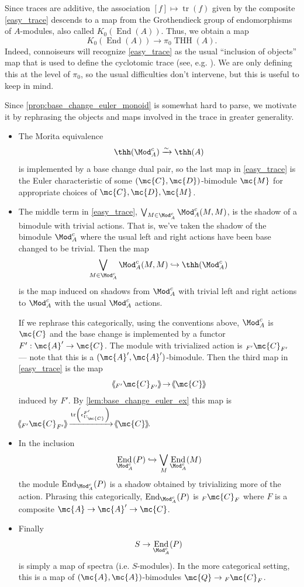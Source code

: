 \documentclass[11pt]{amsart}
\DeclareMathOperator{\End}{End}
\DeclareMathOperator{\tr}{tr}
\newcommand{\rbm}[4]{{#1}^{#2}_{#4}} %
\def\shvar#1#2{{\ensuremath{%
  \hspace{1mm}\makebox[-1mm]{$#1\langle$}\makebox[0mm]{$#1\langle$}\hspace{1mm}%
  {#2}%
  \makebox[1mm]{$#1\rangle$}\makebox[0mm]{$#1\rangle$}%
}}}
\def\sh{\shvar{}}
\begin{document}
\begin{rmk}
  Since traces are additive, the association $[f] \mapsto \operatorname{tr}(f)$ given by the composite \eqref{easy_trace} descends to a map from the Grothendieck group of endomorphisms of $A$-modules, also called $K_0 (\operatorname{End}(A))$. Thus, we obtain a map
  \[
  K_0 (\operatorname{End}(A)) \to \pi_0 \operatorname{THH}(A).
  \]
  Indeed, connoiseurs will recognize \eqref{easy_trace} as the usual ``inclusion of objects'' map that is used to define the cyclotomic trace (see, e.g. \cite{dundas_mccarthy}). We are only defining this at the level of $\pi_0$, so the usual difficulties don't intervene, but this is useful to keep in mind. 
\end{rmk}

Since  \cref{prop:base_change_euler_monoid} is somewhat hard to parse, we motivate it by rephrasing the objects and maps involved in the trace in greater generality. 
\begin{itemize}
\item The Morita equivalence
\[
\thh(\Mod^c_A) \xrightarrow{\sim} \thh(A)
\]
is implemented by a base change dual pair, so the last map in \eqref{easy_trace} is  the Euler characteristic of some $(\mc{C}, \mc{D})$-bimodule $\mc{M}$ for appropriate choices of $\mc{C}, \mc{D}, \mc{M}$. 

\item The middle term in \eqref{easy_trace},  $\bigvee_{M \in \Mod^c_A} \Mod^c_A (M, M)$, is the shadow of a bimodule with trivial actions. That is, we've taken the shadow of the bimodule $\Mod^c_A$ where the usual left and right actions have been base changed to be trivial. 
Then the  map
\[
\bigvee_{M \in \Mod^c_A} \Mod^c_A (M, M) \hookrightarrow \thh(\Mod^c_A)
\]
is the map induced on shadows from $\Mod_A^c$ with trivial left and right actions to $\Mod_A^c$ with the usual $\Mod_A^c$ actions. 

If we rephrase this categorically, using the conventions above, $\Mod_A^c$ is $\mc{C}$ and the base change is implemented by a functor $F': \mc{A}' \to \mc{C}$. The module with trivialized action is $ _{F'} \mc{C}_{F'}$ --- note that this is a $(\mc{A}',\mc{A}')$-bimodule.  Then the third map in \eqref{easy_trace} is the map 
\[\sh{_{F'}\mc{C}_{F'}}\to \sh{\mc{C}}\]
induced by $F'$.
By \cref{lem:base_change_euler_ex} this map is $\sh{_{F'} \mc{C}_{F'}} \xrightarrow{\tr\left(\rbm{\epsilon}{F'}{\mc{C}}{U_\mc{C}}\right)} \sh{\mc{C}}$.


\item In the inclusion
\[
\End_{\Mod^c_A} (P) \hookrightarrow \bigvee_{M} \End_{\Mod^c_A}(M) 
\]
the module $\End_{\Mod^c_A} (P)$ is a shadow obtained by trivializing more of the action. Phrasing this categorically, $\End_{\Mod^c_A} (P)$ is $_F \mc{C}_F$ where $F$ is a composite $\mc{A} \to \mc{A}' \to \mc{C}$. 
\item Finally
\[
S \to \End_{\Mod^c_A} (P)
\]
is simply a map of spectra (i.e. $S$-modules). In the more categorical setting, this is a map of $(\mc{A}, \mc{A})$-bimodules $\mc{Q} \to{ _F \mc{C}_F}$.
\end{itemize}
\end{document}
